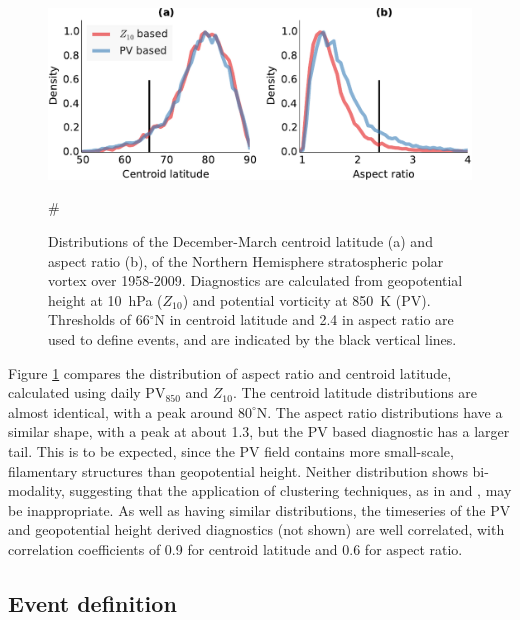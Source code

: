  \begin{figure}
 \centering 
\includegraphics[width=\textwidth]{figures/chapter-moments/moments_distribution_crop.pdf}
\caption[Distributions of $Z_{10}$ and PV-based moment
diagnostics.]{Distributions of the December-March centroid latitude (a) and
  aspect ratio (b), of the Northern Hemisphere stratospheric polar vortex over
  1958-2009. Diagnostics are calculated from geopotential height at 10~hPa
  ($Z_{10}$) and potential vorticity at 850~K (PV). Thresholds of 66$^{\circ}$N
  in centroid latitude and 2.4 in aspect ratio are used to define events, and
  are indicated by the black vertical lines.}
 \label{Fig1}#
 \end{figure}
 Figure \ref{Fig1} compares the distribution of aspect ratio and centroid
 latitude, calculated using daily PV$_{850}$ and $Z_{10}$. The centroid latitude
 distributions are almost identical, with a peak around $80^{\circ}$N. The
 aspect ratio distributions have a similar shape, with a peak at about 1.3, but
 the PV based diagnostic has a larger tail. This is to be expected, since the PV
 field contains more small-scale, filamentary structures than geopotential
 height. Neither distribution shows bi-modality, suggesting that the application
 of clustering techniques, as in \citet{K.Coughlin2009} and
 \citet{Hannachi2010}, may be inappropriate. As well as having similar
 distributions, the timeseries of the PV and geopotential height derived
 diagnostics (not shown) are well correlated, with correlation coefficients of
 0.9 for centroid latitude and 0.6 for aspect ratio.



\subsection{Event definition}

